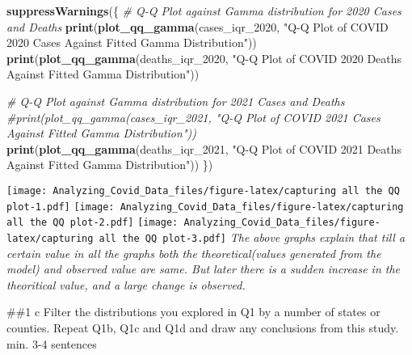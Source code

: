\documentclass[
]{article}
\newenvironment{Shaded}{\begin{snugshade}}{\end{snugshade}}
\newcommand{\CommentTok}[1]{\textcolor[rgb]{0.56,0.35,0.01}{\textit{#1}}}
\newcommand{\FunctionTok}[1]{\textcolor[rgb]{0.13,0.29,0.53}{\textbf{#1}}}
\newcommand{\NormalTok}[1]{#1}
\newcommand{\OtherTok}[1]{\textcolor[rgb]{0.56,0.35,0.01}{#1}}
\newcommand{\SpecialCharTok}[1]{\textcolor[rgb]{0.81,0.36,0.00}{\textbf{#1}}}
\newcommand{\StringTok}[1]{\textcolor[rgb]{0.31,0.60,0.02}{#1}}
\begin{document}
\begin{Shaded}
\begin{Highlighting}[]
\FunctionTok{suppressWarnings}\NormalTok{(\{}
\CommentTok{\# Q{-}Q Plot against Gamma distribution for 2020 Cases and Deaths}
\FunctionTok{print}\NormalTok{(}\FunctionTok{plot\_qq\_gamma}\NormalTok{(cases\_iqr\_2020, }\StringTok{"Q{-}Q Plot of COVID 2020 Cases Against Fitted Gamma Distribution"}\NormalTok{))}
\FunctionTok{print}\NormalTok{(}\FunctionTok{plot\_qq\_gamma}\NormalTok{(deaths\_iqr\_2020, }\StringTok{"Q{-}Q Plot of COVID 2020 Deaths Against Fitted Gamma Distribution"}\NormalTok{))}

\CommentTok{\# Q{-}Q Plot against Gamma distribution for 2021 Cases and Deaths}
\CommentTok{\#print(plot\_qq\_gamma(cases\_iqr\_2021, "Q{-}Q Plot of COVID 2021 Cases Against Fitted Gamma Distribution"))}
\FunctionTok{print}\NormalTok{(}\FunctionTok{plot\_qq\_gamma}\NormalTok{(deaths\_iqr\_2021, }\StringTok{"Q{-}Q Plot of COVID 2021 Deaths Against Fitted Gamma Distribution"}\NormalTok{))}
\NormalTok{\})}
\end{Highlighting}
\end{Shaded}

\texttt{[image: Analyzing\_Covid\_Data\_files/figure-latex/capturing all the QQ plot-1.pdf]}
\texttt{[image: Analyzing\_Covid\_Data\_files/figure-latex/capturing all the QQ plot-2.pdf]}
\texttt{[image: Analyzing\_Covid\_Data\_files/figure-latex/capturing all the QQ plot-3.pdf]}
\emph{The above graphs explain that till a certain value in all the
graphs both the theoretical(values generated from the model) and
observed value are same. But later there is a sudden increase in the
theoritical value, and a large change is observed.}

\#\#1 c Filter the distributions you explored in Q1 by a number of
states or counties. Repeat Q1b, Q1c and Q1d and draw any conclusions
from this study. min. 3-4 sentences

\begin{Shaded}
\end{Shaded}
\end{document}
